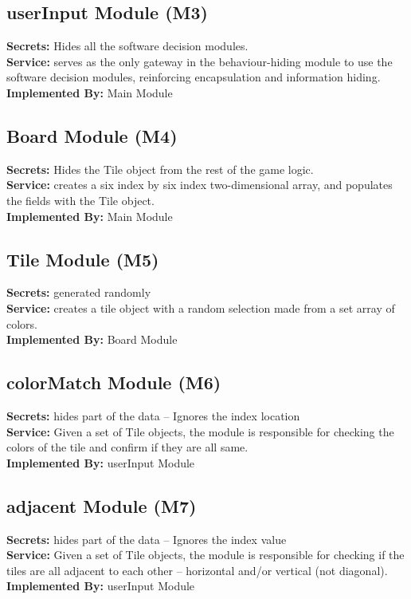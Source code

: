 \documentclass[12pt]{article}
\begin{document}
\subsection{userInput Module (M3)}
\textbf{Secrets:} Hides all the software decision modules.\\
\textbf{Service:} serves as the only gateway in the behaviour-hiding module to use the software decision modules, reinforcing encapsulation and information hiding. \\
\textbf{Implemented By:} Main Module

\subsection{Board Module (M4)}
\textbf{Secrets:} Hides the Tile object from the rest of the game logic.\\
\textbf{Service:} creates a six index by six index two-dimensional array, and populates the fields with the Tile object.\\
\textbf{Implemented By:} Main Module


\subsection{Tile Module (M5)}
\textbf{Secrets:} generated randomly\\
\textbf{Service:} creates a tile object with a random selection made from a set array of colors. \\
\textbf{Implemented By:} Board Module

\subsection{colorMatch Module (M6)}
\textbf{Secrets:} hides part of the data – Ignores the index location\\
\textbf{Service:} Given a set of Tile objects, the module is responsible for checking the colors of the tile and confirm if they are all same. \\
\textbf{Implemented By:} userInput Module

\subsection{adjacent Module (M7)}
\textbf{Secrets:} hides part of the data – Ignores the index value\\
\textbf{Service:} Given a set of Tile objects, the module is responsible for checking if the tiles are all adjacent to each other – horizontal and/or vertical (not diagonal).\\
\textbf{Implemented By:} userInput Module
\end{document}
